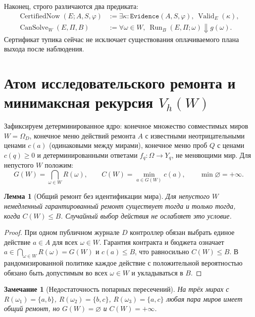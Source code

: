 \documentclass[11pt,a4paper]{article}
\theoremstyle{preprintthm}
\newtheorem{lemma}[theorem]{Лемма}
\theoremstyle{preprintdef}
\newtheorem{remark}[theorem]{Замечание}
\newcommand{\Valid}{\operatorname{Valid}}
\begin{document}
Наконец, строго различаются два предиката:
\begin{equation}
  \begin{aligned}
    \operatorname{CertifiedNow}(E;A,S,\varphi) &:= \exists\kappa:\texttt{Evidence}(A,S,\varphi),\ \Valid_E(\kappa),\\
    \operatorname{CanSolve}_W(E,\Pi,B) &:= \forall\omega\in W,\ \operatorname{Run}_B(E,\Pi;\omega)\Downarrow g(\omega).
  \end{aligned}
\end{equation}
Сертификат тупика сейчас не исключает существования оплачиваемого плана выхода после наблюдения.

\section{Атом исследовательского ремонта и минимаксная рекурсия \texorpdfstring{$V_h(W)$}{V\_h(W)}}

Зафиксируем детерминированное ядро: конечное множество совместимых миров $W=\Omega_D$, конечное меню действий ремонта $A$ с известными неотрицательными ценами $c(a)$ (одинаковыми между мирами), конечное меню проб $Q$ с ценами $c(q)\ge 0$ и детерминированными ответами $f_q:\Omega\to Y_q$, не меняющими мир. Для непустого $W$ положим:
\begin{equation}
  G(W) = \bigcap_{\omega\in W} R(\omega),
  \qquad
  C(W) = \min_{a\in G(W)} c(a),
  \qquad
  \min\varnothing = +\infty.
\end{equation}

\begin{lemma}[Общий ремонт без идентификации мира]
\label{lem:common_repair}
Для непустого $W$ немедленный гарантированный ремонт существует тогда и только тогда, когда $C(W)\le B$. Случайный выбор действия не ослабляет это условие.
\end{lemma}
\begin{proof}
При одном публичном журнале $D$ контроллер обязан выбрать единое действие $a\in A$ для всех $\omega\in W$. Гарантия контракта и бюджета означает $a\in\bigcap_{\omega\in W} R(\omega)=G(W)$ и $c(a)\le B$, что равносильно $C(W)\le B$. В рандомизированной политике каждое действие с положительной вероятностью обязано быть допустимым во всех $\omega\in W$ и укладываться в $B$.
\end{proof}

\begin{remark}[Недостаточность попарных пересечений]
На трёх мирах с $R(\omega_1)=\{a,b\}$, $R(\omega_2)=\{b,c\}$, $R(\omega_3)=\{a,c\}$ любая пара миров имеет общий ремонт, но $G(W)=\varnothing$ и $C(W)=+\infty$.
\end{remark}
\end{document}

